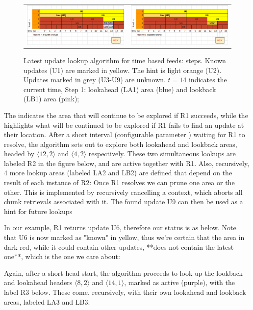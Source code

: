 \begin{figure}[htbp]
\begin{tabular}{c|c}
\includegraphics[width=.5\textwidth]{fig/feeds/6.png}&\includegraphics[width=.5\textwidth]{fig/feeds/7.png}
\end{tabular}
\caption[Latest update lookup algorithm for time based feeds]{Latest update lookup algorithm for time based feeds: steps. Known updates (U1) are marked in yellow. The hint is light orange (U2). Updates marked in grey (U3-U9) are unknown. $t=14$ indicates the current time, Step 1: lookahead (LA1) area (blue) and lookback (LB1) area (pink); }
\label{fig:feeds-lookup-1}
\end{figure}

The  indicates the area that will continue to be explored if R1 succeeds, while the  highlights what will be continued to be explored if R1 fails to find an update at their location. After a short interval (configurable parameter ) waiting for R1 to resolve, the algorithm sets out to explore both lookahead and lookback areas, headed by  $\langle  12, 2 \rangle$ and $\langle  4, 2 \rangle$ respectively. These two simultaneous lookups are labeled R2 in the figure below, and are active together with R1. Also, recursively, 4 more lookup areas (labeled LA2 and LB2) are defined that depend on the result of each instance of R2:
Once R1 resolves we can prune one area or the other. This is implemented by recursively cancelling a context, which aborts all chunk retrievals associated with it. The found update U9 can then be used as a hint for future lookups

In our example, R1 returns update U6, therefore our status is as below. Note that U6 is now marked as "known" in yellow, thus we're certain that the area in dark red, while it could contain other updates, **does not contain the latest one**, which is the one we care about:


Again, after a short head start, the algorithm proceeds to look up the lookback and lookahead headers $\langle  8, 2 \rangle$ and $\langle  14, 1 \rangle$, marked as active (purple), with the label R3 below. These come, recursively, with their own lookahead and lookback areas, labeled LA3 and LB3:

